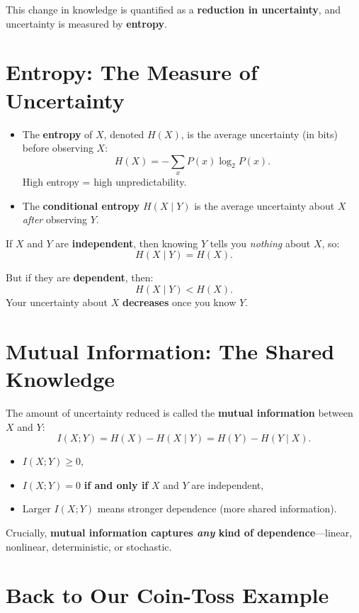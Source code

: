 \documentclass{article}
\begin{document}
This change in knowledge is quantified as a \textbf{reduction in uncertainty}, and uncertainty is measured by \textbf{entropy}.

\section*{Entropy: The Measure of Uncertainty}

\begin{itemize}
\item The \textbf{entropy} of \(X\), denoted \(H(X)\), is the average uncertainty (in bits) before observing \(X\):
    \[
    H(X) = -\sum_x P(x) \log_2 P(x).
    \]
    High entropy = high unpredictability.
    
    \item The \textbf{conditional entropy} \(H(X \mid Y)\) is the average uncertainty about \(X\) \textit{after} observing \(Y\).
\end{itemize}

If \(X\) and \(Y\) are \textbf{independent}, then knowing \(Y\) tells you \textit{nothing} about \(X\), so:
\[
H(X \mid Y) = H(X).
\]

But if they are \textbf{dependent}, then:
\[
H(X \mid Y) < H(X).
\]
Your uncertainty about \(X\) \textbf{decreases} once you know \(Y\).

\section*{Mutual Information: The Shared Knowledge}

The amount of uncertainty reduced is called the \textbf{mutual information} between \(X\) and \(Y\):
\[
I(X; Y) = H(X) - H(X \mid Y) = H(Y) - H(Y \mid X).
\]

\begin{itemize}
\item \(I(X; Y) \geq 0\),
    \item \(I(X; Y) = 0\) \textbf{if and only if} \(X\) and \(Y\) are independent,
    \item Larger \(I(X; Y)\) means stronger dependence (more shared information).
\end{itemize}

Crucially, \textbf{mutual information captures \textit{any} kind of dependence}—linear, nonlinear, deterministic, or stochastic.

\section*{Back to Our Coin-Toss Example}
\end{document}
